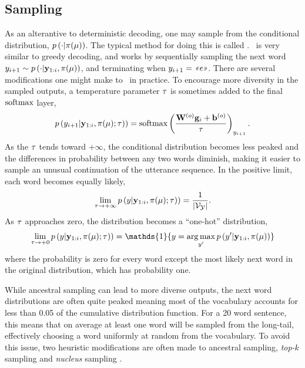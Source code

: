 \subsection{Sampling}

As an alterantive to deterministic decoding, one may sample from the conditional distribution, $p\left(\cdot|\pi(\mu)\right)$. The typical
method for doing this is called \ancestralsampling. \Ancestralsampling~is
very similar to greedy decoding, and works by sequentially sampling the 
next word $y_{i+1} \sim p\left(\cdot|\mathbf{y}_{1:i},\pi(\mu)\right)$, and terminating when $y_{i+1} = \textit{<<e>>}$. There are several modifications one might make to \ancestralsampling~in practice. To encourage more diversity in the sampled outputs,
a temperature parameter $\tau$ is sometimes added to the final $\operatorname*{softmax}$ layer, 
\[ p\left(y_{i+1}| \mathbf{y}_{1:i},\pi(\mu); \tau) \right) = 
\operatorname*{softmax}\left( \frac{\mathbf{W}^{(o)}\mathbf{g}_i + \mathbf{b}^{(o)}}{\tau} \right)_{y_{i+1}}.\]
As the $\tau$ tends toward $+\infty$, the conditional distribution becomes less peaked and the differences in probability between any two words diminish, making it easier to sample an unusual continuation of the utterance sequence.
In the positive limit, each word becomes equally likely,
\[ \lim_{\tau\rightarrow +\infty} 
p\left(y| \mathbf{y}_{1:i},\pi(\mu); \tau) \right) =
\frac{1}{{\left\vert \mathcal{V}_{\mathcal{Y}} \right\vert}}.\]
As $\tau$ approaches zero, the distribution becomes a ``one-hot''
distribution,
\[ \lim_{\temperature\rightarrow +0} 
\gen\left(\utttok| \utttoks_{1:i},\ls(\mr); \temperature) \right) =
\mathds{1}\{\utttok = \argmax_{\utttok^\prime} \gen\left(\utttok^\prime| \utttoks_{1:i},\ls(\mr)\right)  \}\] where the probability is zero
for every word except the most likely next word in the original distribution,
which has probability one.

While ancestral sampling can lead to more diverse outputs, the next word
distributions are often quite peaked meaning most of the vocabulary accounts
for less than
0.05 of the cumulative distribution function. For a 20 word sentence,
this means that on average at least one word will be sampled from the long-tail, effectively choosing a word uniformly at random from the vocabulary.
To avoid this issue, two heuristic modifications are often made to ancestral
sampling, \textit{top-$k$} sampling \citep{somebody} and \textit{nucleus} sampling 
\citep{nuke}. 

